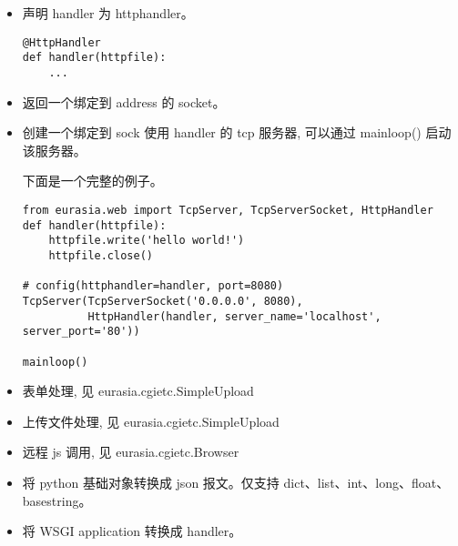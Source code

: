 \documentclass{manual}
\begin{document}
\begin{itemize}

\item {}

声明 handler 为 httphandler。

\begin{verbatim}
@HttpHandler
def handler(httpfile):
	...
\end{verbatim}

\item {}

返回一个绑定到  address 的 socket。

\item {}

创建一个绑定到 sock 使用 handler 的 tcp 服务器, 可以通过 mainloop() 启动该服务器。

下面是一个完整的例子。

\begin{verbatim}
from eurasia.web import TcpServer, TcpServerSocket, HttpHandler
def handler(httpfile):
	httpfile.write('hello world!')
	httpfile.close()

# config(httphandler=handler, port=8080)
TcpServer(TcpServerSocket('0.0.0.0', 8080),
          HttpHandler(handler, server_name='localhost', server_port='80'))

mainloop()
\end{verbatim}

\item {}

表单处理, 见 eurasia.cgietc.SimpleUpload

\item {}

上传文件处理, 见 eurasia.cgietc.SimpleUpload

\item {}

远程 js 调用, 见 eurasia.cgietc.Browser

\item {}

将 python 基础对象转换成 json 报文。仅支持 dict、list、int、long、float、basestring。


\item {}

将 WSGI application 转换成 handler。

\end{itemize}
\end{document}
